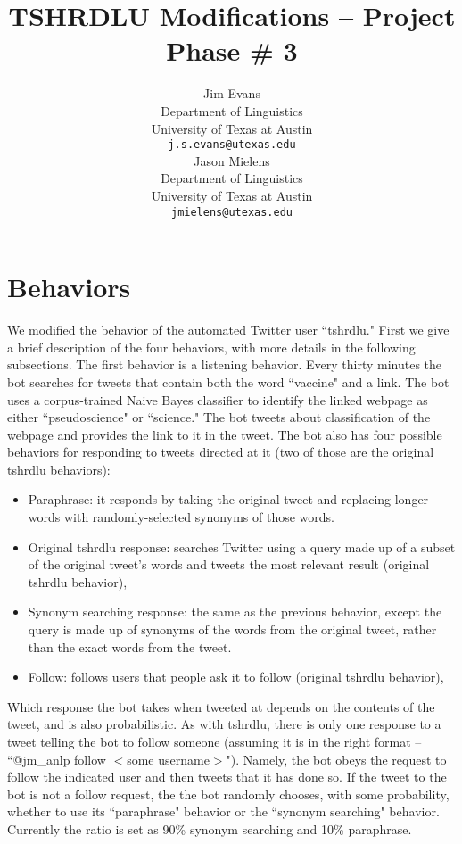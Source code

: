 \documentclass[11pt]{article}
\title{TSHRDLU Modifications -- Project Phase \# 3}
\author{Jim Evans \\
  Department of Linguistics \\
  University of Texas at Austin \\
  {\tt j.s.evans@utexas.edu} \\\And
  Jason Mielens \\
  Department of Linguistics \\
  University of Texas at Austin \\
  {\tt jmielens@utexas.edu} \\}
\date{}
\begin{document}
\maketitle


\section{Behaviors}

We modified the behavior of the automated Twitter user ``tshrdlu." First we give a brief description of the four behaviors, with more details in the following subsections. The first behavior is a listening behavior. Every thirty minutes the bot searches for tweets that contain both the word ``vaccine" and a link. The bot uses a corpus-trained Naive Bayes classifier to identify the linked webpage as either ``pseudoscience" or ``science." The bot tweets about classification of the webpage and provides the link to it in the tweet. The bot also has four possible behaviors for responding to tweets directed at it (two of those are the original tshrdlu behaviors):

\begin{itemize}
\item Paraphrase: it responds by taking the original tweet and replacing longer words with randomly-selected synonyms of those words.
\item Original tshrdlu response: searches Twitter using a query made up of a subset of the original tweet's words and tweets the most relevant result (original tshrdlu behavior),
\item Synonym searching response: the same as the previous behavior, except the query is made up of synonyms of the words from the original tweet, rather than the exact words from the tweet.
\item Follow: follows users that people ask it to follow (original tshrdlu behavior),
\end{itemize}

Which response the bot takes when tweeted at depends on the contents of the tweet, and is also probabilistic. As with tshrdlu, there is only one response to a tweet telling the bot to follow someone (assuming it is in the right format -- ``{@}jm\_anlp follow $<$some username$>$"). Namely, the bot obeys the request to follow the indicated user and then tweets that it has done so. If the tweet to the bot is not a follow request, the the bot randomly chooses, with some probability, whether to use its ``paraphrase" behavior or the ``synonym searching" behavior. Currently the ratio is set as 90\% synonym searching and 10\% paraphrase.
\end{document}
